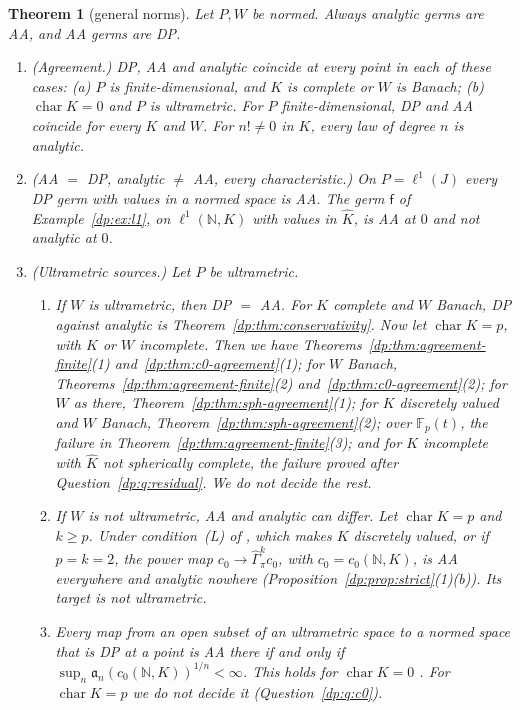 \documentclass[11pt]{amsart}
\newtheorem{theorem}{Theorem}[section]
\theoremstyle{definition}
\theoremstyle{remark}
\numberwithin{equation}{section}
\newcommand{\N}{\mathbb N}
\newcommand{\F}{\mathbb F}
\newcommand{\Kh}{\widehat K}
\theoremstyle{plain}
\theoremstyle{definition}
\theoremstyle{plain}
\newcommand{\hGamma}{\widehat\Gamma}
\begin{document}
\begin{theorem}[general norms]\label{dp:thm:general-norms-agreement}
Let $P,W$ be normed. Always analytic germs are AA, and AA germs are DP.
\begin{enumerate}
\item \textup{(Agreement.)} DP, AA and analytic coincide at every point in each of these cases: \textup{(a)} $P$ is finite-dimensional, and $K$ is complete or $W$ is Banach; \textup{(b)} $\operatorname{char}K=0$ and $P$ is ultrametric. For $P$ finite-dimensional, DP and AA coincide for every $K$ and $W$. For $n!\ne0$ in $K$, every law of degree $n$ is analytic.
\item \textup{(AA $=$ DP, analytic $\ne$ AA, every characteristic.)} On $P=\ell^1(J)$ every DP germ with values in a normed space is AA. The germ $\mathsf f$ of Example~\ref{dp:ex:l1}, on $\ell^1(\N,K)$ with values in $\Kh$, is AA at $0$ and not analytic at $0$.
\item \textup{(Ultrametric sources.)} Let $P$ be ultrametric.
\begin{enumerate}
\item If $W$ is ultrametric, then DP $=$ AA. For $K$ complete and $W$ Banach, DP against analytic is Theorem~\ref{dp:thm:conservativity}. Now let $\operatorname{char}K=p$, with $K$ or $W$ incomplete. Then we have Theorems~\ref{dp:thm:agreement-finite}(1) and~\ref{dp:thm:c0-agreement}(1); for $W$ Banach, Theorems~\ref{dp:thm:agreement-finite}(2) and~\ref{dp:thm:c0-agreement}(2); for $W$ as there, Theorem~\ref{dp:thm:sph-agreement}(1); for $K$ discretely valued and $W$ Banach, Theorem~\ref{dp:thm:sph-agreement}(2); over $\F_p(t)$, the failure in Theorem~\ref{dp:thm:agreement-finite}(3); and for $K$ incomplete with $\Kh$ not spherically complete, the failure proved after Question~\ref{dp:q:residual}. We do not decide the rest.
\item If $W$ is not ultrametric, AA and analytic can differ. Let $\operatorname{char}K=p$ and $k\ge p$. Under condition~\textup{(L)} of \cite[Section~7.1]{I}, which makes $K$ discretely valued, or if $p=k=2$, the power map $c_0\to\hGamma^k_\pi c_0$, with $c_0=c_0(\N,K)$, is AA everywhere and analytic nowhere (Proposition~\ref{dp:prop:strict}(1)(b)). Its target is not ultrametric.
\item Every map from an open subset of an ultrametric space to a normed space that is DP at a point is AA there if and only if $\sup_n\mathfrak a_n(c_0(\N,K))^{1/n}<\infty$. This holds for $\operatorname{char}K=0$ \cite[Theorem~14.39(3)]{I}. For $\operatorname{char}K=p$ we do not decide it (Question~\ref{dp:q:c0}).

\end{enumerate}
\end{enumerate}
\end{theorem}
\end{document}
